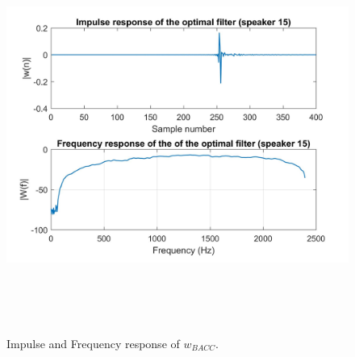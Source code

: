 \begin{figure}[H]
\centering
\includegraphics[width=13cm,height=13cm,keepaspectratio]{Figures/ir_fr_w}
\decoRule
\caption[Impulse and frequency response of $w_{BACC}$]{Impulse and Frequency response of $w_{BACC}$.}
\label{fig:ir_fr_w}
\end{figure}

